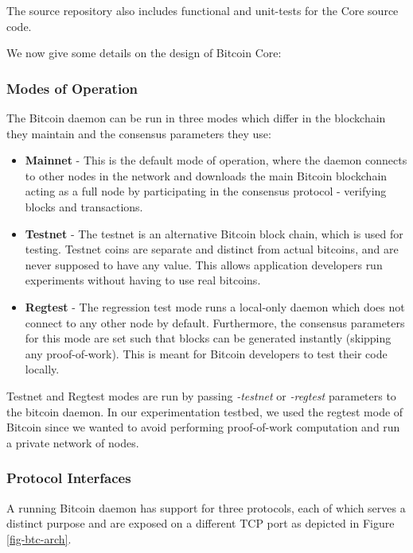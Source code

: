 The source repository also includes functional and unit-tests for the Core source code.

We now give some details on the design of Bitcoin Core:

\subsubsection{Modes of Operation} \label{btc-modes}

The Bitcoin daemon can be run in three modes which differ in the blockchain they maintain and the consensus parameters they use:

\begin{itemize}
    \item \textbf{Mainnet} - This is the default mode of operation, where the daemon connects to other nodes in the network and downloads the main Bitcoin blockchain acting as a full node by participating in the consensus protocol - verifying blocks and transactions.

    \item \textbf{Testnet} - The testnet is an alternative Bitcoin block chain, which is used for testing. 
    Testnet coins are separate and distinct from actual bitcoins, and are never supposed to have any value. 
    This allows application developers run experiments without having to use real bitcoins.

    \item \textbf{Regtest} - The regression test mode runs a local-only daemon which does not connect to any other node by default. 
    Furthermore, the consensus parameters for this mode are set such that blocks can be generated instantly (skipping any proof-of-work).
    This is meant for Bitcoin developers to test their code locally.
\end{itemize}

Testnet and Regtest modes are run by passing \textit{-testnet} or \textit{-regtest} parameters to the bitcoin daemon.
In our experimentation testbed, we used the regtest mode of Bitcoin since we wanted to avoid performing proof-of-work computation and run a private network of nodes.

\subsubsection{Protocol Interfaces} \label{btc-interfaces}

A running Bitcoin daemon has support for three protocols, each of which serves a distinct purpose and are exposed on a different TCP port as depicted in Figure \ref{fig-btc-arch}.

